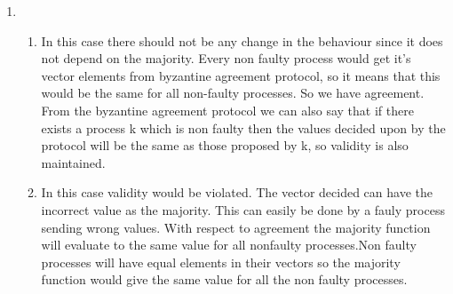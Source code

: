 \documentclass[12pt]{article}
\begin{document}
\begin{enumerate}
\begin{enumerate}
\end{enumerate}
\item \begin{enumerate}
\item In this case there should not be any change in the behaviour since it does not depend on  the majority. Every non faulty process would get it's vector elements from byzantine agreement protocol, so it means that this would be the same for all non-faulty processes. So we have agreement. From the byzantine agreement protocol we can also say that if there exists a process k which is non faulty then the values decided upon by the protocol will be the same as those proposed by k, so validity is also maintained.

\item In this case validity would be violated. The vector decided can have the incorrect value as the majority. This can easily be done by a fauly process sending wrong values.
With respect to agreement the majority function will evaluate to the same value for all nonfaulty processes.Non faulty processes will have equal elements in their vectors so the majority function would give the same value for all the non faulty processes.
\end{enumerate}
\end{enumerate}
\end{document}
